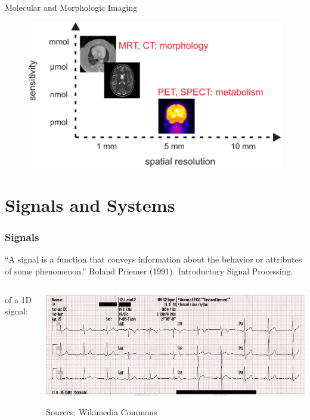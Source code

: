 \begin{frame}[c]{Molecular and Morphologic Imaging}
    \begin{figure}
        \includegraphics[width=.8\linewidth]{../00_motivation/Bilder/moletab.pdf}
    \end{figure}
\end{frame}

\section{Signals and Systems} %


\begin{frame}

    \frametitle{Signals}
    \begin{myDefinition}
        ``A signal is a function that conveys information about the behavior or attributes of some phenomenon.''\quad
        {\scriptsize
            Roland Priemer (1991). Introductory Signal Processing.
        }
    \end{myDefinition}
    \begin{columns}[c, onlytextwidth]
        \begin{column}{0.4\textwidth}
            \myExample{} of a 1D signal:
        \end{column}\begin{column}{0.6\textwidth}
            \includegraphics[height=.45\textheight ]{images/ecg}
            \begin{flushright}
                \scriptsize Sources: Wikimedia Commons
            \end{flushright}
        \end{column}
    \end{columns}

\end{frame}

